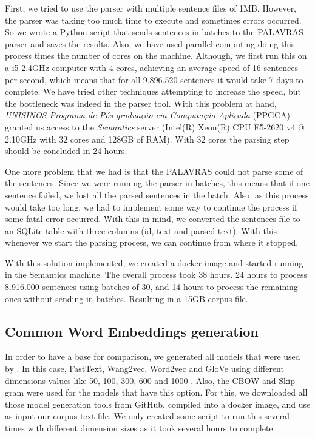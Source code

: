 First, we tried to use the parser with multiple sentence files of 1MB. However, the parser was taking too much time to execute and sometimes errors occurred. So we wrote a Python script that sends sentences in batches to the PALAVRAS parser and saves the results. Also, we have used parallel computing doing this process times the number of cores on the machine. Although, we first run this on a i5 2.4GHz computer with 4 cores, achieving an average speed of 16 sentences per second, which means that for all 9.896.520 sentences it would take 7 days to complete. We have tried other techniques attempting to increase the speed, but the bottleneck was indeed in the parser tool. 
With this problem at hand, \textit{UNISINOS Programa de Pós-graduação em Computação Aplicada} (PPGCA) granted us access to the \textit{Semantics} server (Intel(R) Xeon(R) CPU E5-2620 v4 @ 2.10GHz with 32 cores and 128GB of RAM). With 32 cores the parsing step should be concluded in 24 hours.

One more problem that we had is that the PALAVRAS could not parse some of the sentences. Since we were running the parser in batches, this means that if one sentence failed, we lost all the parsed sentences in the batch. Also, as this process would take too long, we had to implement some way to continue the process if some fatal error occurred. With this in mind, we converted the sentences file to an SQLite table with three columns (id, text and parsed text). With this whenever we start the parsing process, we can continue from where it stopped.

With this solution implemented, we created a docker image and started running in the Semantics machine. The overall process took 38 hours. 24 hours to process 8.916.000 sentences using batches of 30, and 14 hours to process the remaining ones without sending in batches. Resulting in a 15GB corpus file.


\subsection{Common Word Embeddings generation}\label{chap:methodsandmaterials:wegeneration}

In order to have a base for comparison, we generated all models that were used by . In this case, FastText, Wang2vec, Word2vec and GloVe using different dimensions values like 50, 100, 300, 600 and 1000 \cite{bojanowski2016enriching, Ling:2015:naacl, Mikolov2013DistributedRO, Pennington2014}. Also, the CBOW and Skip-gram were used for the models that have this option.
For this, we downloaded all those model generation tools from GitHub, compiled into a docker image, and use as input our corpus text file. We only created some script to run this several times with different dimension sizes as it took several hours to complete.

